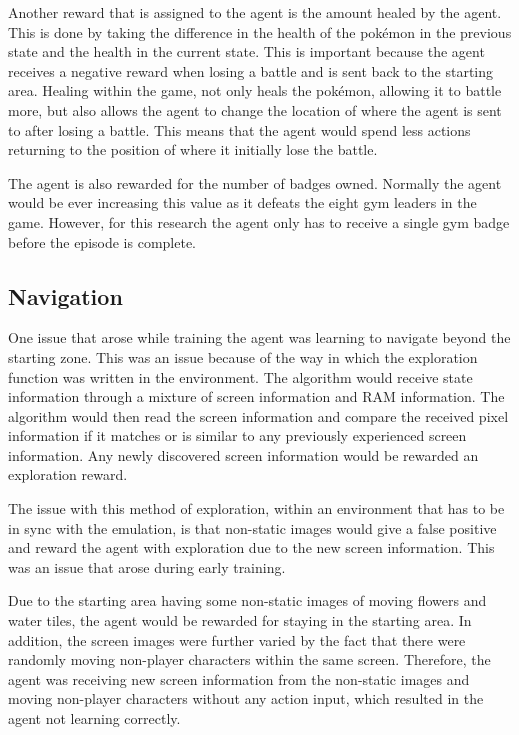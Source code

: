 Another reward that is assigned to the agent is the amount healed by the agent. This is done by taking the difference in the health of the pokémon in the previous state and the health in the current state. This is important because the agent receives a negative reward when losing a battle and is sent back to the starting area. Healing within the game, not only heals the pokémon, allowing it to battle more, but also allows the agent to change the location of where the agent is sent to after losing a battle. This means that the agent would spend less actions returning to the position of where it initially lose the battle.

The agent is also rewarded for the number of badges owned. Normally the agent would be ever increasing this value as it defeats the eight gym leaders in the game. However, for this research the agent only has to receive a single gym badge before the episode is complete.

\subsection{Navigation}

One issue that arose while training the agent was learning to navigate beyond the starting zone. This was an issue because of the way in which the exploration function was written in the environment. The algorithm would receive state information through a mixture of screen information and RAM information. The algorithm would then read the screen information and compare the received pixel information if it matches or is similar to any previously experienced screen information. Any newly discovered screen information would be rewarded an exploration reward. 

The issue with this method of exploration, within an environment that has to be in sync with the emulation, is that non-static images would give a false positive and reward the agent with exploration due to the new screen information. This was an issue that arose during early training. 

Due to the starting area having some non-static images of moving flowers and water tiles, the agent would be rewarded for staying in the starting area. In addition, the screen images were further varied by the fact that there were randomly moving non-player characters within the same screen. Therefore, the agent was receiving new screen information from the non-static images and moving non-player characters without any action input, which resulted in the agent not learning correctly.

